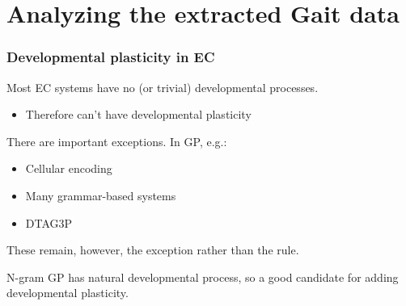 \documentclass{beamer}
\newcommand{\linespace}{\vskip 0.25cm}
\begin{document}
\section[Gait Analysis]{Analyzing the extracted Gait data}
\begin{frame}
	\frametitle{Developmental plasticity in EC}
	
	Most EC systems have no (or trivial) developmental processes.
	\begin{itemize}
		\item Therefore can't have developmental plasticity
	\end{itemize}
	
	\linespace
	
	There are important exceptions.  In GP, e.g.:
	\begin{itemize}
		\item Cellular encoding
		\item Many grammar-based systems
		\item DTAG3P
	\end{itemize}
	
	\linespace 
	
	These remain, however, the exception rather than the rule.
	
	\linespace
	
	N-gram GP has natural developmental process, so a good candidate for adding developmental plasticity.
\end{frame}
%
%
%  
\end{document}
